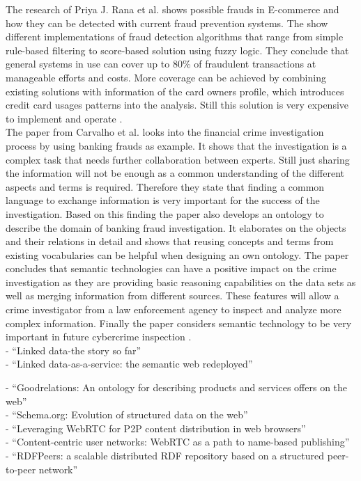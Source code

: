 The research of Priya J. Rana et al. shows possible frauds in \gls{E-commerce} and how they can be detected with current fraud prevention systems. The show different implementations of fraud detection algorithms that range from simple rule-based filtering to score-based solution using fuzzy logic. They conclude that general systems in use can cover up to 80\% of fraudulent transactions at manageable efforts and costs. More coverage can be achieved by combining existing solutions with information of the card owners profile, which introduces credit card usages patterns into the analysis. Still this solution is very expensive to implement and operate \citep{rana2015survey}. \\

The paper from Carvalho et al. looks into the financial crime investigation process by using banking frauds as example. It shows that the investigation is a complex task that needs further collaboration between experts. Still just sharing the information will not be enough as a common understanding of the different aspects and terms is required. Therefore they state that finding a common language to exchange information is very important for the success of the investigation. Based on this finding the paper also develops an ontology to describe the domain of banking fraud investigation. It elaborates on the objects and their relations in detail and shows that reusing concepts and terms from existing vocabularies can be helpful when designing an own ontology. The paper concludes that semantic technologies can have a positive impact on the crime investigation as they are providing basic reasoning capabilities on the data sets as well as merging information from different sources. These features will allow a crime investigator from a law enforcement agency to inspect and analyze more complex information. Finally the paper considers semantic technology to be very important in future cybercrime inspection \citep{carvalhoapplying}. \\

- ``Linked data-the story so far'' \citep{bizer2009linked} \\
- ``Linked data-as-a-service: the semantic web redeployed'' \citep{rietveld2015linked}

- ``Goodrelations: An ontology for describing products and services offers on the web'' \citep{hepp2008goodrelations} \\
- ``Schema.org: Evolution of structured data on the web'' \citep{guha2016schema} \\
- ``Leveraging WebRTC for P2P content distribution in web browsers'' \citep{vogt2013leveraging} \\
- ``Content-centric user networks: WebRTC as a path to name-based publishing'' \citep{vogt2013content} \\
- ``RDFPeers: a scalable distributed RDF repository based on a structured peer-to-peer network'' \citep{cai2004rdfpeers}

